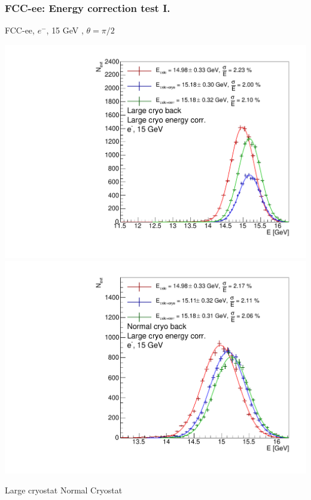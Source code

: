 \documentclass{beamer}
\newcommand{\redtext}[1]{%
  \textcolor{myRed}{#1}
}
\begin{document}
\begin{frame}
  \frametitle{FCC-ee: Energy correction test I.}

  \centering
  FCC-ee, $e^{-}$, \redtext{15 GeV}, $\theta = \pi/2$ \\[1.5ex]
  \begin{adjustwidth}{-9mm}{-9mm}
    \includegraphics[width=0.49\linewidth]{figures/energy_corr/large_cryo__large_cryo_corr/sums_large_cryo__large_cryo_corr_90deg_15gev.pdf}
    \includegraphics[width=0.49\linewidth]{figures/energy_corr/normal_cryo__large_cryo_corr/sums_normal_cryo__large_cryo_corr_90deg_15gev.pdf}
  \end{adjustwidth}
  Large cryostat \hspace{4cm} Normal Cryostat
\end{frame}
\end{document}
